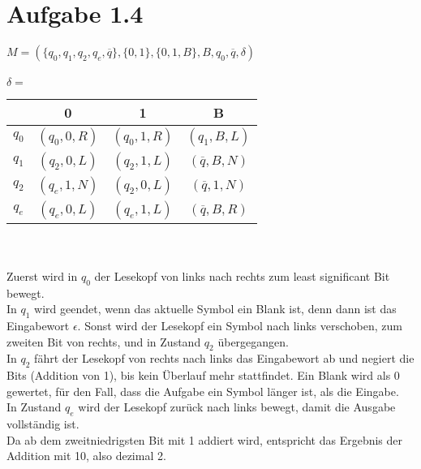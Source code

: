 \documentclass[11pt, oneside]{article}   	%
\begin{document}
\section*{Aufgabe 1.4}
$M=(\{q_0, q_1, q_2, q_e, \overline{q} \}, \{0, 1 \}, \{0, 1, B \}, B, q_0, \overline{q}, \delta)$
\\ \ \\
$\delta = $
\begin{tabular}{c|c|c|c}
& 0 & 1 & B\\
\hline
$q_0$ & $(q_0, 0, R)$ & $(q_0, 1, R)$ & $(q_1, B, L)$\\
$q_1$ & $(q_2, 0, L)$ & $(q_2, 1, L)$ & $(\overline{q}, B, N)$\\
$q_2$ & $(q_e, 1, N)$ & $(q_2, 0, L)$ & $(\overline{q}, 1, N)$\\
$q_e$ & $(q_e, 0, L)$ & $(q_e, 1, L)$ & $(\overline{q}, B, R)$\\
\end{tabular}
\\ \ \\
Zuerst wird in $q_0$ der Lesekopf von links nach rechts zum least significant Bit bewegt.\\
In $q_1$ wird geendet, wenn das aktuelle Symbol ein Blank ist, denn dann ist das Eingabewort $\epsilon$. Sonst wird der Lesekopf ein Symbol nach links verschoben, zum zweiten Bit von rechts, und in Zustand $q_2$ \"ubergegangen.\\
In $q_2$ f\"ahrt der Lesekopf von rechts nach links das Eingabewort ab und negiert die Bits (Addition von 1), bis kein \"Uberlauf mehr stattfindet. Ein Blank wird als 0 gewertet, f\"ur den Fall, dass die Aufgabe ein Symbol l\"anger ist, als die Eingabe.\\
In Zustand $q_e$ wird der Lesekopf zur\"uck nach links bewegt, damit die Ausgabe vollst\"andig ist.\\
Da ab dem zweitniedrigsten Bit mit 1 addiert wird, entspricht das Ergebnis der Addition mit 10, also dezimal 2.
\end{document}
